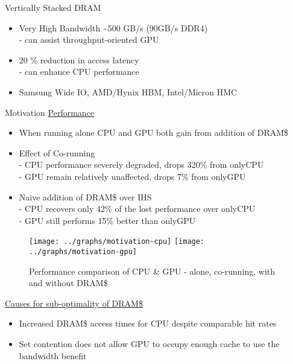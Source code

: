 \documentclass[final,t]{beamer}
\begin{document}
\begin{frame}[t,fragile]{}
\begin{columns}[t]
\begin{column}{.47\linewidth}
\begin{exampleblock}{Vertically Stacked DRAM}
\begin{itemize}
    		\item Very High Bandwidth \textasciitilde 500 GB/s (90GB/s DDR4)\\
    				\qquad - can assist throughput-oriented GPU
    		\item 20 \% reduction in access latency \\
    				\qquad - can enhance CPU performance
        	\item Samsung Wide IO, AMD/Hynix HBM, Intel/Micron HMC
        \end{itemize}
    \end{exampleblock}
    \begin{exampleblock}{Motivation}
    \centering 
    \underline{Performance}

    \begin{itemize}
       	\item When running alone CPU and GPU both gain from addition of DRAM\$
      	\item Effect of Co-running \\
      		\qquad - CPU performance severely degraded, drops 320\% from onlyCPU\\
      		\qquad - GPU remain relatively unaffected, drops 7\% from onlyGPU
      	\item Naive addition of DRAM\$ over IHS \\
      		\qquad - CPU recovers only 42\% of the lost performance over onlyCPU \\
      		\qquad - GPU still performs  15\% better than onlyGPU \\
    \end{itemize}
    \begin{figure}
       \texttt{[image: ../graphs/motivation-cpu]}
       \texttt{[image: ../graphs/motivation-gpu]}
       \caption{Performance comparison of CPU \& GPU - alone, co-running, with and without DRAM\$}
       \label{fig:motivation}
    \end{figure}
    
    \underline{Causes for sub-optimality of DRAM\$}
    \begin{itemize}
   		\item Increased DRAM\$ access times for CPU despite comparable hit rates
        \item Set contention does not allow GPU to occupy enough cache to use the bandwidth benefit
    \end{itemize}
    

\end{exampleblock}
\end{column}
\end{columns}
\end{frame}
\end{document}
